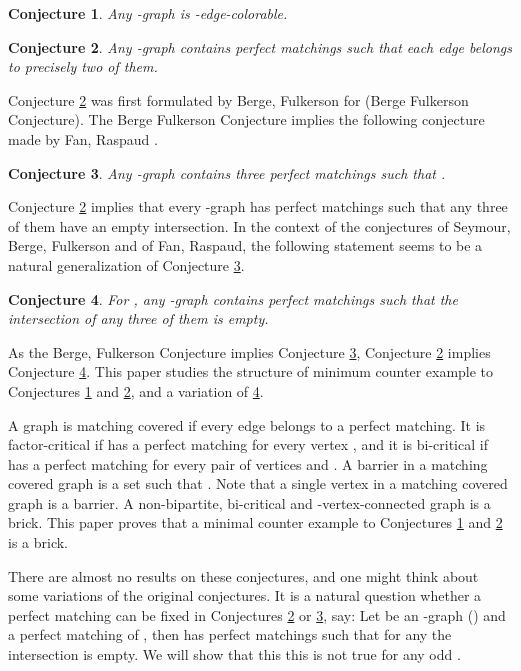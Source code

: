 \documentclass[fleqn,12pt]{article}
\newtheorem{conjecture}{Conjecture}
\begin{document}
\begin{conjecture}\label{SeymourColoring} Any -graph is -edge-colorable.
\end{conjecture}

\begin{conjecture}\label{SeymourPerfects} Any -graph contains  perfect matchings such that each edge belongs to precisely two of them.
\end{conjecture}

Conjecture \ref{SeymourPerfects} was first formulated by Berge, Fulkerson for  (Berge Fulkerson Conjecture).  
The Berge Fulkerson Conjecture implies the following conjecture made by Fan, Raspaud \cite{FanRaspaud}.

\begin{conjecture}\label{FanRaspaud} Any -graph contains three perfect matchings  such that .
\end{conjecture}

Conjecture \ref{SeymourPerfects} implies that every -graph has  perfect matchings such that any three of them have an empty intersection. In the context of the conjectures
of Seymour, Berge, Fulkerson and of Fan, Raspaud, the following statement seems to be a natural generalization of Conjecture \ref{FanRaspaud}.

\begin{conjecture}\label{FanRaspaud_r} For , any -graph contains  perfect matchings such that the intersection of any three of them is empty.
\end{conjecture}

As the Berge, Fulkerson Conjecture implies Conjecture \ref{FanRaspaud}, Conjecture \ref{SeymourPerfects} implies Conjecture \ref{FanRaspaud_r}.
This paper studies the structure of minimum counter example to Conjectures \ref{SeymourColoring} and \ref{SeymourPerfects}, 
and a variation of \ref{FanRaspaud_r}.

A graph  is matching covered if every edge belongs to a perfect matching. It is factor-critical if  has a perfect matching for every vertex , and it 
is bi-critical if  has a perfect matching for every pair of vertices  and .  A barrier in a matching covered graph is a set 
such that . Note that a single vertex in a matching covered graph is a barrier. A non-bipartite, bi-critical and -vertex-connected graph is a brick. 
This paper proves that a minimal counter example to Conjectures \ref{SeymourColoring} and \ref{SeymourPerfects} is a brick. 

There are almost no results on these conjectures, and one might think about some variations of the original conjectures. 
It is a natural question whether a perfect matching can be fixed in Conjectures \ref{SeymourPerfects} or \ref{FanRaspaud}, say: 
Let  be an -graph () and  a perfect matching of , then  has  perfect matchings  such that 
for any  the intersection  is empty. We will show that this this is not true for any odd . 
\end{document}
